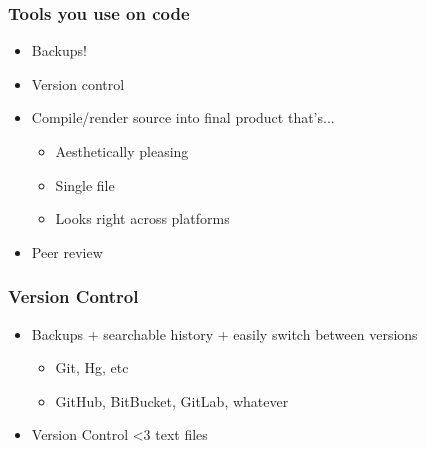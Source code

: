 \documentclass{beamer}
\begin{document}
\begin{frame}
 \frametitle{Tools you use on code}



\begin{itemize}
  \item Backups!
  \item Version control
  \item Compile/render source into final product that's...
\begin{itemize}
  \item Aesthetically pleasing
  \item Single file
  \item Looks right across platforms
\end{itemize}
  \item Peer review
\end{itemize}


\end{frame}
\begin{frame}
 \frametitle{Version Control}



\begin{itemize}
  \item Backups + searchable history + easily switch between versions
\begin{itemize}
  \item Git, Hg, etc
  \item GitHub, BitBucket, GitLab, whatever
\end{itemize}
  \item Version Control <3 text files
\end{itemize}


\end{frame}
\end{document}
